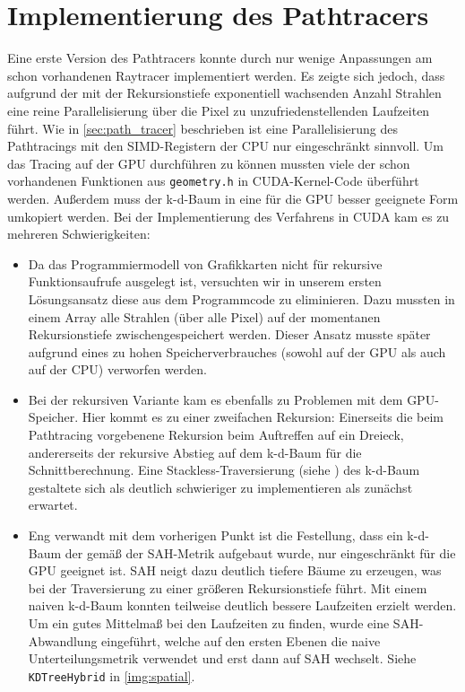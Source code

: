 \section{Implementierung des Pathtracers}
Eine erste Version des Pathtracers konnte durch nur wenige Anpassungen am schon vorhandenen Raytracer implementiert werden. Es zeigte sich jedoch, dass aufgrund der mit der Rekursionstiefe exponentiell wachsenden Anzahl Strahlen eine reine Parallelisierung über die Pixel zu unzufriedenstellenden Laufzeiten führt.
Wie in \autoref{sec:path_tracer} beschrieben ist eine Parallelisierung des Pathtracings mit den SIMD-Registern der CPU nur eingeschränkt sinnvoll.
Um das Tracing auf der GPU durchführen zu können mussten viele der schon vorhandenen Funktionen aus \texttt{geometry.h} in CUDA-Kernel-Code überführt werden. Außerdem muss der k-d-Baum in eine für die GPU besser geeignete Form umkopiert werden. Bei der Implementierung des Verfahrens in CUDA kam es zu mehreren Schwierigkeiten: 
\begin{itemize}
\item Da das Programmiermodell von Grafikkarten nicht für rekursive Funktionsaufrufe ausgelegt ist, versuchten wir in unserem ersten Lösungsansatz diese aus dem Programmcode zu eliminieren. Dazu mussten in einem Array alle Strahlen (über alle Pixel) auf der momentanen Rekursionstiefe zwischengespeichert werden. Dieser Ansatz musste später aufgrund eines zu hohen Speicherverbrauches (sowohl auf der GPU als auch auf der CPU) verworfen werden.
\item Bei der rekursiven Variante kam es ebenfalls zu Problemen mit dem GPU-Speicher. Hier kommt es zu einer zweifachen Rekursion: Einerseits die beim Pathtracing vorgebenene Rekursion beim Auftreffen auf ein Dreieck, andererseits der rekursive Abstieg auf dem k-d-Baum für die Schnittberechnung. Eine \glqq Stackless\grqq-Traversierung (siehe \cite{popov2007stackless}) des k-d-Baum gestaltete sich als deutlich schwieriger zu implementieren als zunächst erwartet.
\item Eng verwandt mit dem vorherigen Punkt ist die Festellung, dass ein k-d-Baum der gemäß der SAH-Metrik aufgebaut wurde, nur eingeschränkt für die GPU geeignet ist. SAH neigt dazu deutlich tiefere Bäume zu erzeugen, was bei der Traversierung zu einer größeren Rekursionstiefe führt. Mit einem naiven k-d-Baum konnten teilweise deutlich bessere Laufzeiten erzielt werden. Um ein gutes Mittelmaß bei den Laufzeiten zu finden, wurde eine SAH-Abwandlung eingeführt, welche auf den ersten Ebenen die naive Unterteilungsmetrik verwendet und erst dann auf SAH wechselt. Siehe \texttt{KDTreeHybrid} in \ref{img:spatial}.
\end{itemize}

